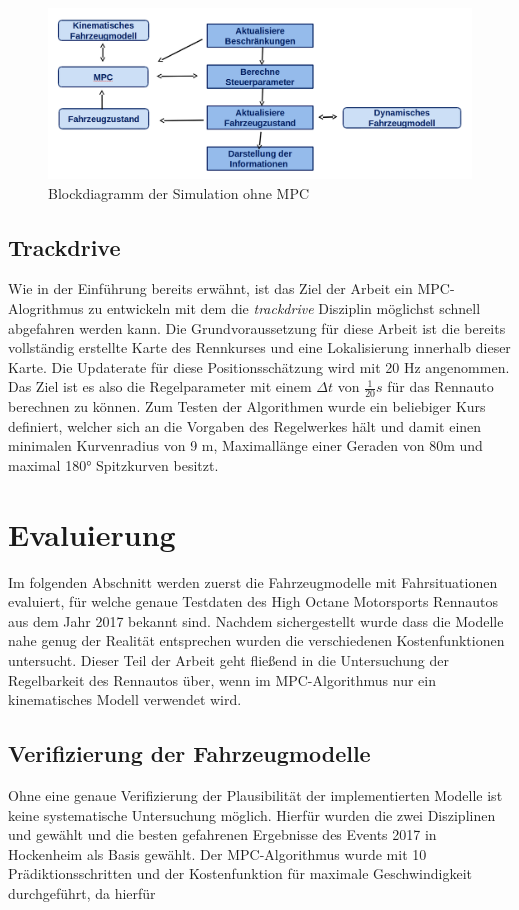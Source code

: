 \documentclass{like}
\begin{document}
\begin{figure}[ht!]
	\centering
	\includegraphics[width=350pt]{Abbildungen/sim_for_loop.png}
	\caption{Blockdiagramm der Simulation ohne MPC}
	\label{fig:block_diagram_sim}
\end{figure}


\section{Trackdrive}
Wie in der Einführung bereits erwähnt, ist das Ziel der Arbeit ein \ac{MPC}-Alogrithmus zu entwickeln mit dem die \emph{trackdrive} Disziplin möglichst schnell abgefahren werden kann. Die Grundvoraussetzung für diese Arbeit ist die bereits vollständig erstellte Karte des Rennkurses und eine Lokalisierung innerhalb dieser Karte. Die Updaterate für diese Positionsschätzung wird mit 20 Hz angenommen. Das Ziel ist es also die Regelparameter mit einem $\Delta t$ von $\frac{1}{20} s$ für das Rennauto berechnen zu können.  Zum Testen der Algorithmen wurde ein beliebiger Kurs definiert, welcher sich an die Vorgaben des Regelwerkes hält und damit einen minimalen Kurvenradius von 9 m, Maximallänge einer Geraden von 80m und maximal 180° Spitzkurven besitzt.

\chapter{Evaluierung}
Im folgenden Abschnitt werden zuerst die Fahrzeugmodelle mit Fahrsituationen evaluiert, für welche genaue Testdaten des High Octane Motorsports Rennautos aus dem Jahr 2017 bekannt sind. 
Nachdem sichergestellt wurde dass die Modelle nahe genug der Realität entsprechen wurden die verschiedenen Kostenfunktionen untersucht. Dieser Teil der Arbeit geht fließend in die Untersuchung der Regelbarkeit des Rennautos über, wenn im MPC-Algorithmus nur ein kinematisches Modell verwendet wird.

\section{Verifizierung der Fahrzeugmodelle}
Ohne eine genaue Verifizierung der Plausibilität der implementierten Modelle ist keine systematische Untersuchung möglich. Hierfür wurden die zwei Disziplinen  und  gewählt und die besten gefahrenen Ergebnisse des Events 2017 in Hockenheim als Basis gewählt.
Der \ac{MPC}-Algorithmus wurde mit 10 Prädiktionsschritten und der Kostenfunktion für maximale Geschwindigkeit durchgeführt, da hierfür  
\end{document}
